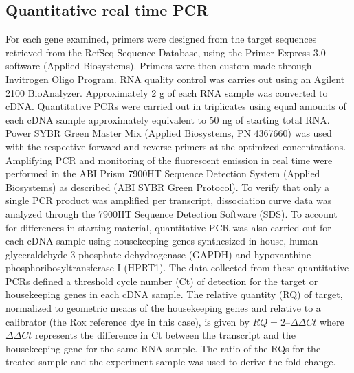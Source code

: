 \subsection{Quantitative real time PCR }
For each gene examined, primers were designed from the target 
sequences retrieved from the RefSeq Sequence Database, using the 
Primer Express 3.0 software (Applied Biosystems). Primers were 
then custom made through Invitrogen Oligo Program. RNA quality 
control was carries out using an Agilent 2100 BioAnalyzer. 
Approximately 2 \textmugreek{}g of each RNA sample was converted 
to cDNA. Quantitative PCRs were carried out in triplicates 
using equal amounts of each cDNA sample approximately equivalent 
to 50 ng of starting total RNA. Power SYBR Green Master 
Mix (Applied Biosystems, PN 4367660) was used with the 
respective forward and reverse primers at the optimized 
concentrations. Amplifying PCR and monitoring of the 
fluorescent emission in real time were performed in the ABI 
Prism 7900HT Sequence Detection System (Applied Biosystems) 
as described (ABI SYBR Green Protocol).  To verify that only 
a single PCR product was amplified per transcript, dissociation 
curve data was analyzed through the 7900HT Sequence Detection 
Software (SDS).  To account for differences in starting 
material, quantitative PCR was also carried out for each 
cDNA sample using housekeeping genes synthesized in-house, 
human glyceraldehyde-3-phosphate dehydrogenase (GAPDH) and 
hypoxanthine phosphoribosyltransferase I (HPRT1).  The data 
collected from these quantitative PCRs defined a threshold 
cycle number (Ct) of detection for the target or housekeeping 
genes in each cDNA sample. The relative quantity (RQ) of 
target, normalized to geometric means of the housekeeping 
genes and relative to a calibrator (the Rox reference dye 
in this case), is given by $RQ = 2 –\Delta \Delta Ct$ 
where $\Delta \Delta Ct$ represents the difference in 
Ct between the transcript and the housekeeping gene for the 
same RNA sample. The ratio of the RQs for the treated 
sample and the experiment sample was used to derive the fold change.
 
